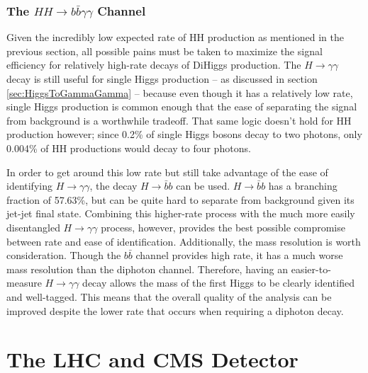 \documentclass[12pt]{ucsddissertation}
\begin{document}
\subsection{The $HH \rightarrow b\bar{b}\gamma\gamma$ Channel}\label{sec:HH2b2g}

Given the incredibly low expected rate of HH production as mentioned in the previous section, all possible pains must be taken to maximize the signal efficiency for relatively high-rate decays of DiHiggs production. The $H \rightarrow \gamma \gamma$ decay is still useful for single Higgs production -- as discussed in section \ref{sec:HiggsToGammaGamma} -- because even though it has a relatively low rate, single Higgs production is common enough that the ease of separating the signal from background is a worthwhile tradeoff. That same logic doesn't hold for HH production however; since 0.2\% of single Higgs bosons decay to two photons, only 0.004\% of HH productions would decay to four photons. 

In order to get around this low rate but still take advantage of the ease of identifying $H \rightarrow \gamma\gamma$, the decay $H \rightarrow \bar{b}b$ can be used. $H \rightarrow \bar{b}b$ has a branching fraction of 57.63\%, but can be quite hard to separate from background given its jet-jet final state. Combining this higher-rate process with the much more easily disentangled $H \rightarrow \gamma\gamma$ process, however, provides the best possible compromise between rate and ease of identification. Additionally, the mass resolution is worth consideration. Though the $b\bar{b}$ channel provides high rate, it has a much worse mass resolution than the diphoton channel. Therefore, having an easier-to-measure $H \rightarrow \gamma \gamma$ decay allows the mass of the first Higgs to be clearly identified and well-tagged. This means that the overall quality of the analysis can be improved despite the lower rate that occurs when requiring a diphoton decay.

\chapter{The LHC and CMS Detector} \label{chapter:LHCandCMS}
\end{document}
